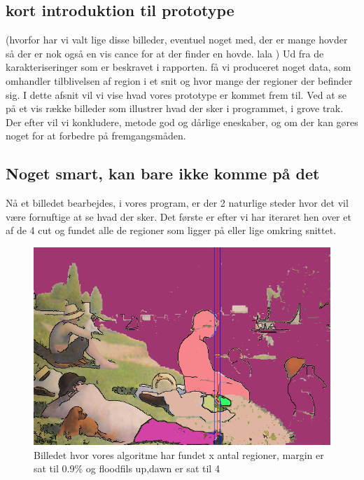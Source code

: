 \subsection{kort introduktion til prototype}
(hvorfor har vi valt lige disse billeder, eventuel noget med, der er mange hovder så der er nok også en vis cance for at der finder en hovde. lala
)
Ud fra de karakteriseringer som er beskravet i rapporten. få vi
produceret noget data, som omhandler tilblivelsen af region i et snit og
hvor mange der regioner der befinder sig. I dette afsnit vil vi vise
hvad vores prototype er kommet frem til. Ved at se på et vis række billeder
som illustrer hvad der sker i programmet, i grove trak. Der efter vil vi
konkludere, metode god og dårlige eneskaber, og om der kan gøres noget for at
forbedre på fremgangsmåden.


\subsection{Noget smart, kan bare ikke komme på det}
Nå et billedet bearbejdes, i vores program, er der 2 naturlige steder
hvor det vil være fornuftige at se hvad der sker. Det første er efter vi har
iteraret hen over et af de 4 cut og fundet alle de regioner som ligger
på eller lige omkring snittet.

\begin{figure}[h!!]
	\begin{center}
		\includegraphics[scale=0.42,angle=0]{afsnit/afprovning/billeder/floodfillbilledet.png}
	\end{center}
	\caption[]{Billedet hvor vores algoritme har fundet x antal regioner, margin er sat til 0.9\% og floodfils up,dawn er sat til 4}
	\label{ff}
\end{figure}


